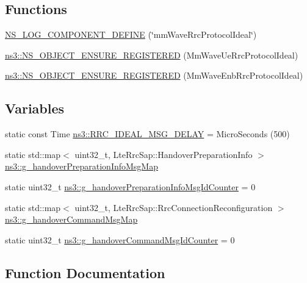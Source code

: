 \subsection*{Functions}
\begin{DoxyCompactItemize}
\item 
\hyperlink{mmwave-rrc-protocol-ideal_8cc_ac9c5c06d9defb6d6fdf69cb2af8145a6}{N\+S\+\_\+\+L\+O\+G\+\_\+\+C\+O\+M\+P\+O\+N\+E\+N\+T\+\_\+\+D\+E\+F\+I\+NE} (\char`\"{}mm\+Wave\+Rrc\+Protocol\+Ideal\char`\"{})
\item 
\hyperlink{namespacens3_a59a90b4e399ed67e79f39d0ee417e474}{ns3\+::\+N\+S\+\_\+\+O\+B\+J\+E\+C\+T\+\_\+\+E\+N\+S\+U\+R\+E\+\_\+\+R\+E\+G\+I\+S\+T\+E\+R\+ED} (Mm\+Wave\+Ue\+Rrc\+Protocol\+Ideal)
\item 
\hyperlink{namespacens3_ac589d4e49994f69ca0e51c44b92aab76}{ns3\+::\+N\+S\+\_\+\+O\+B\+J\+E\+C\+T\+\_\+\+E\+N\+S\+U\+R\+E\+\_\+\+R\+E\+G\+I\+S\+T\+E\+R\+ED} (Mm\+Wave\+Enb\+Rrc\+Protocol\+Ideal)
\end{DoxyCompactItemize}
\subsection*{Variables}
\begin{DoxyCompactItemize}
\item 
static const Time \hyperlink{namespacens3_a491c1ae41d0f077411ab2b4e7ba7eca7}{ns3\+::\+R\+R\+C\+\_\+\+I\+D\+E\+A\+L\+\_\+\+M\+S\+G\+\_\+\+D\+E\+L\+AY} = Micro\+Seconds (500)
\item 
static std\+::map$<$ uint32\+\_\+t, Lte\+Rrc\+Sap\+::\+Handover\+Preparation\+Info $>$ \hyperlink{namespacens3_ad689fb5b09e0c6d2664564d7702a7057}{ns3\+::g\+\_\+handover\+Preparation\+Info\+Msg\+Map}
\item 
static uint32\+\_\+t \hyperlink{namespacens3_a81c49b1f2b9186e6563f062f368d2ce6}{ns3\+::g\+\_\+handover\+Preparation\+Info\+Msg\+Id\+Counter} = 0
\item 
static std\+::map$<$ uint32\+\_\+t, Lte\+Rrc\+Sap\+::\+Rrc\+Connection\+Reconfiguration $>$ \hyperlink{namespacens3_a91b859adf7aa4002786efb8373bed902}{ns3\+::g\+\_\+handover\+Command\+Msg\+Map}
\item 
static uint32\+\_\+t \hyperlink{namespacens3_ab0ce416eca2703c77fbb54df25089ef4}{ns3\+::g\+\_\+handover\+Command\+Msg\+Id\+Counter} = 0
\end{DoxyCompactItemize}


\subsection{Function Documentation}
